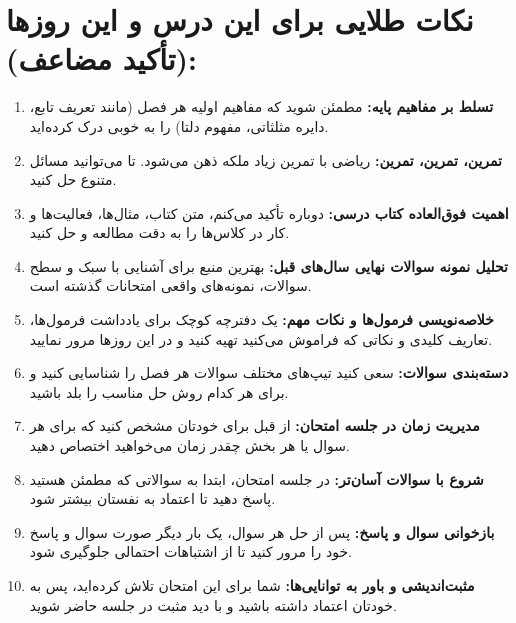 \documentclass[12pt,a4paper]{article}
\begin{document}
\section*{نکات طلایی برای این درس و این روزها (تأکید مضاعف):}
\begin{enumerate}[label=\arabic*., itemsep=0.2em, topsep=0.3em]
    \item \textbf{تسلط بر مفاهیم پایه:} مطمئن شوید که مفاهیم اولیه هر فصل (مانند تعریف تابع، دایره مثلثاتی، مفهوم دلتا) را به خوبی درک کرده‌اید.
    \item \textbf{تمرین، تمرین، تمرین:} ریاضی با تمرین زیاد ملکه ذهن می‌شود. تا می‌توانید مسائل متنوع حل کنید.
    \item \textbf{اهمیت فوق‌العاده کتاب درسی:} دوباره تأکید می‌کنم، متن کتاب، مثال‌ها، فعالیت‌ها و کار در کلاس‌ها را به دقت مطالعه و حل کنید.
    \item \textbf{تحلیل نمونه سوالات نهایی سال‌های قبل:} بهترین منبع برای آشنایی با سبک و سطح سوالات، نمونه‌های واقعی امتحانات گذشته است.
    \item \textbf{خلاصه‌نویسی فرمول‌ها و نکات مهم:} یک دفترچه کوچک برای یادداشت فرمول‌ها، تعاریف کلیدی و نکاتی که فراموش می‌کنید تهیه کنید و در این روزها مرور نمایید.
    \item \textbf{دسته‌بندی سوالات:} سعی کنید تیپ‌های مختلف سوالات هر فصل را شناسایی کنید و برای هر کدام روش حل مناسب را بلد باشید.
    \item \textbf{مدیریت زمان در جلسه امتحان:} از قبل برای خودتان مشخص کنید که برای هر سوال یا هر بخش چقدر زمان می‌خواهید اختصاص دهید.
    \item \textbf{شروع با سوالات آسان‌تر:} در جلسه امتحان، ابتدا به سوالاتی که مطمئن هستید پاسخ دهید تا اعتماد به نفستان بیشتر شود.
    \item \textbf{بازخوانی سوال و پاسخ:} پس از حل هر سوال، یک بار دیگر صورت سوال و پاسخ خود را مرور کنید تا از اشتباهات احتمالی جلوگیری شود.
    \item \textbf{مثبت‌اندیشی و باور به توانایی‌ها:} شما برای این امتحان تلاش کرده‌اید، پس به خودتان اعتماد داشته باشید و با دید مثبت در جلسه حاضر شوید.
\end{enumerate}
\end{document}
